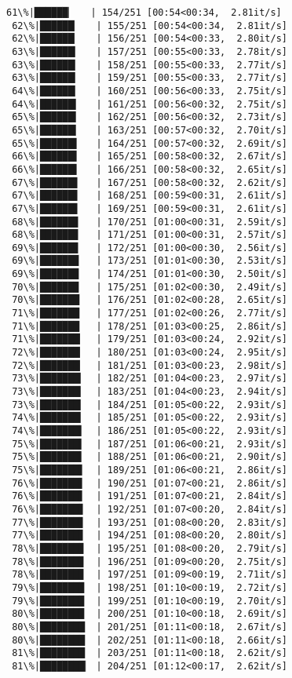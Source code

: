 \documentclass[11pt]{article}
\begin{document}
\begin{Verbatim}[commandchars=\\\{\}]
 61\%|██████▏   | 154/251 [00:54<00:34,  2.81it/s]
 62\%|██████▏   | 155/251 [00:54<00:34,  2.81it/s]
 62\%|██████▏   | 156/251 [00:54<00:33,  2.80it/s]
 63\%|██████▎   | 157/251 [00:55<00:33,  2.78it/s]
 63\%|██████▎   | 158/251 [00:55<00:33,  2.77it/s]
 63\%|██████▎   | 159/251 [00:55<00:33,  2.77it/s]
 64\%|██████▎   | 160/251 [00:56<00:33,  2.75it/s]
 64\%|██████▍   | 161/251 [00:56<00:32,  2.75it/s]
 65\%|██████▍   | 162/251 [00:56<00:32,  2.73it/s]
 65\%|██████▍   | 163/251 [00:57<00:32,  2.70it/s]
 65\%|██████▌   | 164/251 [00:57<00:32,  2.69it/s]
 66\%|██████▌   | 165/251 [00:58<00:32,  2.67it/s]
 66\%|██████▌   | 166/251 [00:58<00:32,  2.65it/s]
 67\%|██████▋   | 167/251 [00:58<00:32,  2.62it/s]
 67\%|██████▋   | 168/251 [00:59<00:31,  2.61it/s]
 67\%|██████▋   | 169/251 [00:59<00:31,  2.61it/s]
 68\%|██████▊   | 170/251 [01:00<00:31,  2.59it/s]
 68\%|██████▊   | 171/251 [01:00<00:31,  2.57it/s]
 69\%|██████▊   | 172/251 [01:00<00:30,  2.56it/s]
 69\%|██████▉   | 173/251 [01:01<00:30,  2.53it/s]
 69\%|██████▉   | 174/251 [01:01<00:30,  2.50it/s]
 70\%|██████▉   | 175/251 [01:02<00:30,  2.49it/s]
 70\%|███████   | 176/251 [01:02<00:28,  2.65it/s]
 71\%|███████   | 177/251 [01:02<00:26,  2.77it/s]
 71\%|███████   | 178/251 [01:03<00:25,  2.86it/s]
 71\%|███████▏  | 179/251 [01:03<00:24,  2.92it/s]
 72\%|███████▏  | 180/251 [01:03<00:24,  2.95it/s]
 72\%|███████▏  | 181/251 [01:03<00:23,  2.98it/s]
 73\%|███████▎  | 182/251 [01:04<00:23,  2.97it/s]
 73\%|███████▎  | 183/251 [01:04<00:23,  2.94it/s]
 73\%|███████▎  | 184/251 [01:05<00:22,  2.93it/s]
 74\%|███████▎  | 185/251 [01:05<00:22,  2.93it/s]
 74\%|███████▍  | 186/251 [01:05<00:22,  2.93it/s]
 75\%|███████▍  | 187/251 [01:06<00:21,  2.93it/s]
 75\%|███████▍  | 188/251 [01:06<00:21,  2.90it/s]
 75\%|███████▌  | 189/251 [01:06<00:21,  2.86it/s]
 76\%|███████▌  | 190/251 [01:07<00:21,  2.86it/s]
 76\%|███████▌  | 191/251 [01:07<00:21,  2.84it/s]
 76\%|███████▋  | 192/251 [01:07<00:20,  2.84it/s]
 77\%|███████▋  | 193/251 [01:08<00:20,  2.83it/s]
 77\%|███████▋  | 194/251 [01:08<00:20,  2.80it/s]
 78\%|███████▊  | 195/251 [01:08<00:20,  2.79it/s]
 78\%|███████▊  | 196/251 [01:09<00:20,  2.75it/s]
 78\%|███████▊  | 197/251 [01:09<00:19,  2.71it/s]
 79\%|███████▉  | 198/251 [01:10<00:19,  2.72it/s]
 79\%|███████▉  | 199/251 [01:10<00:19,  2.70it/s]
 80\%|███████▉  | 200/251 [01:10<00:18,  2.69it/s]
 80\%|████████  | 201/251 [01:11<00:18,  2.67it/s]
 80\%|████████  | 202/251 [01:11<00:18,  2.66it/s]
 81\%|████████  | 203/251 [01:11<00:18,  2.62it/s]
 81\%|████████▏ | 204/251 [01:12<00:17,  2.62it/s]

\end{Verbatim}
\end{document}
